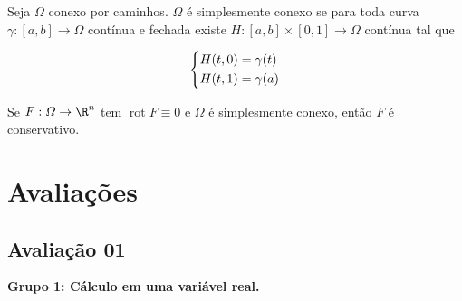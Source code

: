 \documentclass{book}
\newcommand{\rot}{\operatorname{rot}}	%
\begin{document}
\begin{defn}
Seja $\varOmega$ conexo por caminhos. $\varOmega$ \'e simplesmente conexo se para toda curva $\gamma:[a,b] \to \varOmega$ cont\'inua e fechada existe $H:[a,b] \times [0,1] \to \varOmega$ cont\'inua tal que

\[
\left\{ \begin{gathered}
  H(t,0) = \gamma (t) \hfill \\
  H(t,1) = \gamma (a) \hfill \\ 
\end{gathered}  \right.
\]

\end{defn}

\begin{teo}
Se $F:\varOmega \to \R^n$ tem $\rot F \equiv 0$ e $\varOmega$ \'e simplesmente conexo, ent\~ao $F$ \'e conservativo.
\end{teo}

\appendix
\chapter{Avalia\c{c}\~oes} \label{chapAv}

\section{Avalia\c{c}\~ao 01} \label{secP1}

\textbf{Grupo 1: C\'alculo em uma vari\'avel real.}
\end{document}
